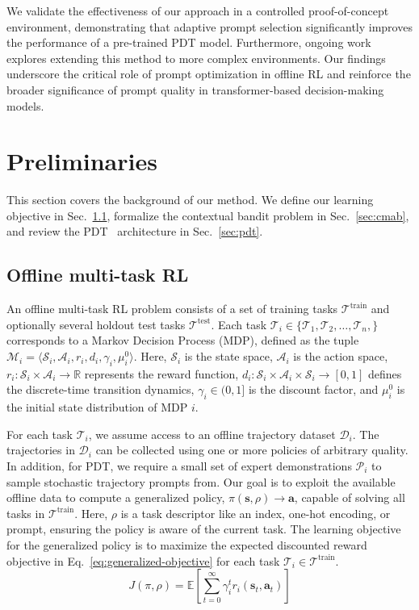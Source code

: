 \documentclass{article}
\begin{document}
We validate the effectiveness of our approach in a controlled proof-of-concept environment, demonstrating that adaptive prompt selection significantly improves the performance of a pre-trained PDT model. Furthermore, ongoing work explores extending this method to more complex environments. Our findings underscore the critical role of prompt optimization in offline RL and reinforce the broader significance of prompt quality in transformer-based decision-making models.


\section{Preliminaries}
This section covers the background of our method. We define our learning objective in Sec.~\ref{sec:orl}, formalize the contextual bandit problem in Sec.~\ref{sec:cmab},
and review the PDT~\citep{xu2022prompting} architecture in Sec.~\ref{sec:pdt}.

\subsection{Offline multi-task RL}\label{sec:orl}
An offline multi-task RL problem consists of a set of training tasks $\mathcal{T}^\text{train}$ and optionally several holdout test tasks $\mathcal{T}^\text{test}$. 
Each task $\mathcal{T}_i \in \{ \mathcal{T}_1, \mathcal{T}_2, \dots, \mathcal{T}_n,\}$ corresponds to a Markov Decision Process (MDP), defined as the tuple $\mathcal{M}_i = \langle \mathcal{S}_i, \mathcal{A}_i, r_i, d_i, \gamma_i, \mu_i^0 \rangle$. 
Here, $\mathcal{S}_i$ is the state space, $\mathcal{A}_i$ is the action space, $r_i: \mathcal{S}_i \times \mathcal{A}_i \to \mathbb{R}$ represents the reward function, $d_i: \mathcal{S}_i \times \mathcal{A}_i \times \mathcal{S}_i \to [0, 1]$ defines the discrete-time transition dynamics, $\gamma_i \in (0, 1]$ is the discount factor, and $\mu_i^0$ is the initial state distribution of MDP $i$. 

For each task $\mathcal{T}_i$, we assume access to an offline trajectory dataset $\mathcal{D}_i$.
The trajectories in $\mathcal{D}_i$ can be collected using one or more policies of arbitrary quality. In addition, for PDT, we require a small set of expert demonstrations $\mathcal{P}_i$ to sample stochastic trajectory prompts from.
Our goal is to exploit the available offline data to compute a generalized policy, $\pi(\mathbf{s}, \rho) \to \mathbf{a}$, capable of solving all tasks in $\mathcal{T}^\text{train}$.
Here, $\rho$ is a task descriptor like an index, one-hot encoding, or prompt, ensuring the policy is aware of the current task.
The learning objective for the generalized policy is to maximize the expected discounted reward objective in Eq.~\eqref{eq:generalized-objective} for each task $\mathcal{T}_i \in \mathcal{T}^\text{train}$.
\begin{equation}\label{eq:generalized-objective}
    J(\pi, \rho) = \mathbb{E} \left[ \sum_{t=0}^\infty \gamma_{i}^t r_i(\mathbf{s}_t, \mathbf{a}_t) \right]
\end{equation}
\end{document}
